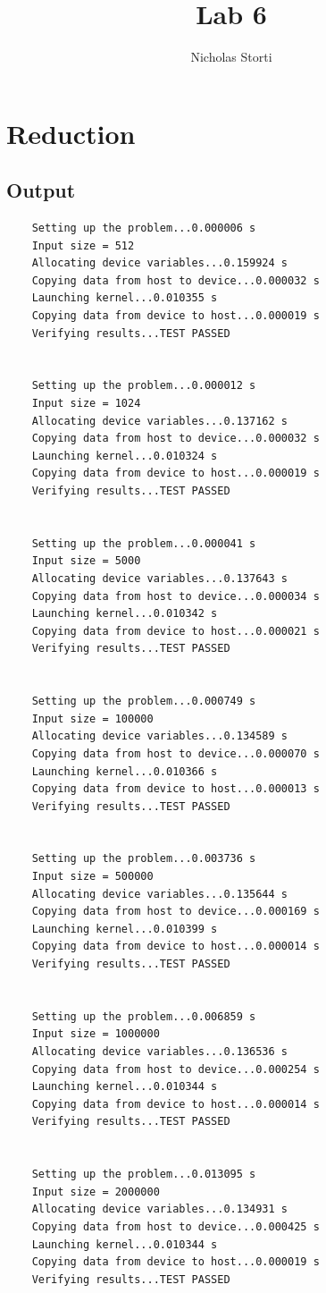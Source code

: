 \documentclass{article}
\title{Lab 6}
\author{Nicholas Storti}
\begin{document}
\maketitle

\section{Reduction}

\subsection{Output}
\begin{verbatim}
	Setting up the problem...0.000006 s
	Input size = 512
	Allocating device variables...0.159924 s
	Copying data from host to device...0.000032 s
	Launching kernel...0.010355 s
	Copying data from device to host...0.000019 s
	Verifying results...TEST PASSED
	
	
	Setting up the problem...0.000012 s
	Input size = 1024
	Allocating device variables...0.137162 s
	Copying data from host to device...0.000032 s
	Launching kernel...0.010324 s
	Copying data from device to host...0.000019 s
	Verifying results...TEST PASSED
	
	
	Setting up the problem...0.000041 s
	Input size = 5000
	Allocating device variables...0.137643 s
	Copying data from host to device...0.000034 s
	Launching kernel...0.010342 s
	Copying data from device to host...0.000021 s
	Verifying results...TEST PASSED
	
	
	Setting up the problem...0.000749 s
	Input size = 100000
	Allocating device variables...0.134589 s
	Copying data from host to device...0.000070 s
	Launching kernel...0.010366 s
	Copying data from device to host...0.000013 s
	Verifying results...TEST PASSED
	
	
	Setting up the problem...0.003736 s
	Input size = 500000
	Allocating device variables...0.135644 s
	Copying data from host to device...0.000169 s
	Launching kernel...0.010399 s
	Copying data from device to host...0.000014 s
	Verifying results...TEST PASSED
	
	
	Setting up the problem...0.006859 s
	Input size = 1000000
	Allocating device variables...0.136536 s
	Copying data from host to device...0.000254 s
	Launching kernel...0.010344 s
	Copying data from device to host...0.000014 s
	Verifying results...TEST PASSED
	
	
	Setting up the problem...0.013095 s
	Input size = 2000000
	Allocating device variables...0.134931 s
	Copying data from host to device...0.000425 s
	Launching kernel...0.010344 s
	Copying data from device to host...0.000019 s
	Verifying results...TEST PASSED
\end{verbatim}
	
\end{document}
